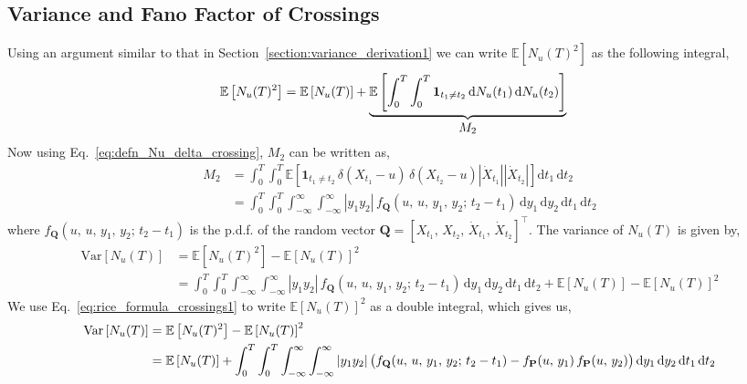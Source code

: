\documentclass[journal]{IEEEtran}
\theoremstyle{plain}
\theoremstyle{definition}
\theoremstyle{remark}
\newcommand{\E}{\mathbb{E}}
\newcommand{\Nu}{N_u(T)}
\newcommand{\dd}{\mathrm{d}}
\newcommand{\Var}{\text{Var}}
\begin{document}
\subsection{Variance and Fano Factor of Crossings}
Using an argument similar to that in Section~\ref{section:variance_derivation1} we can write $\E\left[\Nu^2\right]$ as the following integral,
\begin{equation}
\begin{split}
    \E\left[\Nu^2\right] &=  \E\left[\Nu\right] + \underbrace{\E\left[\int_0^T \int_0^T \mathbf{1}_{t_1\neq t_2}  \,\dd {N_u}(t_1)  \, \dd {N_u}(t_2)\right]}_{\text{\normalsize \(M_2\)}}
\end{split}
\end{equation}
Now using Eq.~\eqref{eq:defn_Nu_delta_crossing}, $M_2$ can be written as,
\begin{equation}
\begin{split}
    M_2 &= \int_0^T \int_0^T \E\left[\mathbf{1}_{t_1\neq t_2} \, \delta\left(X_{t_1} - u\right) \, \delta\left(X_{t_2} - u\right)  \left|\dot{X}_{t_1}\right|  \left|\dot{X}_{t_2}\right| \right] \dd t_1 \, \dd t_2 \\
    &= \int_0^T \int_0^T \int_{-\infty}^\infty \int_{-\infty}^\infty \left|y_1 y_2\right| \, f_{\mathbf{Q}}(u, \,u, \,y_1, \,y_2; \, t_2 - t_1) \, \dd y_1 \, \dd y_2 \, \dd t_1 \, \dd t_2
\end{split}
\end{equation}
where $f_{\mathbf{Q}}(u, \,u, \,y_1, \,y_2; \, t_2 - t_1)$ is the p.d.f. of the random vector $\mathbf{Q} = [X_{t_1}, \, X_{t_2}, \, \dot{X}_{t_1}, \, \dot{X}_{t_2}]^\top$. The variance of $\Nu$ is given by,
\begin{equation}
\begin{split}
    \Var\left[\Nu\right] &= \E\left[\Nu^2\right] - \E\left[\Nu\right]^2 \\
    &=  \int_0^T \int_0^T \int_{-\infty}^\infty \int_{-\infty}^\infty \left|y_1 y_2\right| \, f_{\mathbf{Q}}(u, \,u, \,y_1, \,y_2; \, t_2 - t_1) \, \dd y_1 \, \dd y_2 \, \dd t_1 \, \dd t_2  + \E\left[\Nu\right] - \E\left[\Nu\right]^2 
\end{split}
\end{equation}
We use Eq.~\eqref{eq:rice_formula_crossings1} to write $\E\left[\Nu\right]^2$ as a double integral, which gives us,
\begin{equation}
\begin{split}
    \Var\left[\Nu\right] &= \E\left[\Nu^2\right] - \E\left[\Nu\right]^2 \\
    &= \E\left[\Nu\right] + \int_0^T \int_0^T \int_{-\infty}^\infty \int_{-\infty}^\infty \left|y_1 y_2\right| \bigl(f_{\mathbf{Q}}(u, \,u, \,y_1, \,y_2; \, t_2 - t_1) - f_{\mathbf{P}}(u,\,y_1) \, f_{\mathbf{P}}(u,\,y_2)\bigr)\, \dd y_1 \, \dd y_2 \, \dd t_1 \, \dd t_2
\end{split}
\raisetag{40pt}
\end{equation}
\end{document}
